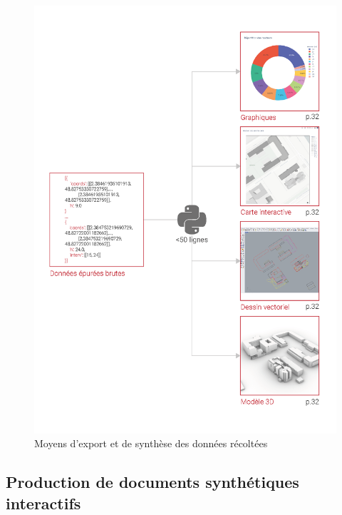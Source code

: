 \documentclass[
  11pt,
  french,
]{article}
\begin{document}
\begin{tcolorbox}
\begin{figure}

{\centering \includegraphics[height=1\textheight]{__imgs/p2} 

}

\caption[Moyens d'export et de synthèse des données récoltées  -  Réalisation personnelle]{Moyens d'export et de synthèse des données récoltées}\label{fig:p2_sommaire}
\end{figure}
\end{tcolorbox}

\newpage

\hypertarget{production-de-documents-synthuxe9tiques-interactifs}{%
\subsection{Production de documents synthétiques
interactifs}\label{production-de-documents-synthuxe9tiques-interactifs}}
\end{document}
